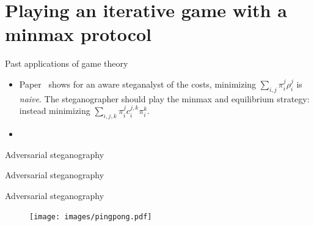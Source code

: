 \documentclass[10pt,aspectratio=169]{beamer}
\begin{document}
\section{Playing an iterative game with a \textbf{minmax} protocol}

\begin{frame}{Past applications of game theory}

    \begin{itemize}
        \item  Paper~ shows for an aware steganalyst of the costs,  minimizing $\sum_{i,j} \pi_i^j \rho_i^j$ is \textit{naive}. The steganographer should play the minmax and equilibrium strategy: instead minimizing $\sum_{i, j, k} \pi_{i}^{j} c_{i}^{j, k} \pi_{i}^{k}$.
        \item  
    \end{itemize}
    
\end{frame}

\begin{frame}{Adversarial steganography}
\end{frame}


\begin{frame}{Adversarial steganography}
\end{frame}



\begin{frame}{Adversarial steganography}
  \begin{figure}
        \texttt{[image: images/pingpong.pdf]}
    \end{figure}
\end{frame}
\end{document}
